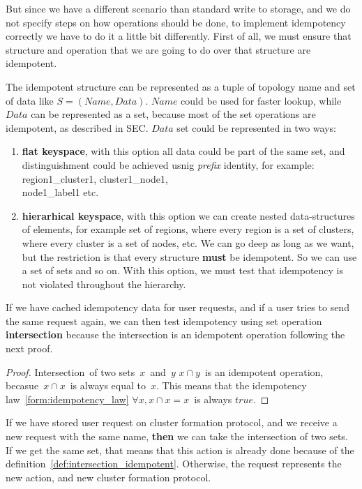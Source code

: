 But since we have a different scenario than standard write to storage, and we do not specify steps on how operations should be done, to implement idempotency correctly we have to do it a little bit differently. First of all, we must ensure that structure and operation that we are going to do over that structure are idempotent.

The idempotent structure can be represented as a tuple of topology name and set of data like $S=(Name, Data)$. $Name$ could be used for faster lookup, while $Data$ can be represented as a set, because most of the set operations are idempotent, as described in SEC. $Data$ set could be represented in two ways:

\begin{enumerate}[start=1,label={(\bfseries \arabic*)}]
	\item \textbf{flat keyspace}, with this option all data could be part of the same set, and distinguishment could be achieved usnig \textit{prefix} identity, for example: region1\_cluster1, cluster1\_node1, \\node1\_label1 etc.
	\item \textbf{hierarhical keyspace}, with this option we can create nested data-structures of elements, for example set of regions, where every region is a set of clusters, where every cluster is a set of nodes, etc. We can go deep as long as we want, but the restriction is that every structure \textbf{must} be idempotent. So we can use a set of sets and so on. With this option, we must test that idempotency is not violated throughout the hierarchy.
\end{enumerate}

\noindent
If we have cached idempotency data for user requests, and if a user tries to send the same request again, we can then test idempotency using set operation \textbf{intersection} because the intersection is an idempotent operation following the next proof.

\begin{proof}\label{def:intersection_idempotent}
	Intersection of two sets $x$ and $y$ $x \cap y$ is an idempotent operation, becasue $x \cap x$ is always equal to $x$. This means that the idempotency law~\ref{form:idempotency_law} $\forall x, x \cap x = x$ is always $true$.
\end{proof}

\noindent
If we have stored user request on cluster formation protocol, and we receive a new request with the same name, \textbf{then} we can take the intersection of two sets. If we get the same set, that means that this action is already done because of the definition~\ref{def:intersection_idempotent}. Otherwise, the request represents the new action, and new cluster formation protocol. 

